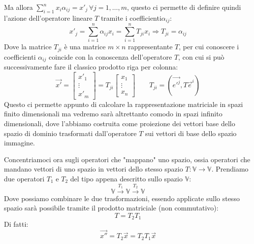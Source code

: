 Ma allora $\sum_{i=1}^{n} x_i\alpha_{ij}={x'}_j \, \forall j=1,\dots,m$, questo ci permette di definire quindi l'azione dell'operatore lineare $T$ tramite i coefficienti$\alpha_{ij}$:
\begin{equation}
    {x'}_j = \sum_{i=1}^{n} \alpha_{ij} x_i =
    \sum_{i=1}^{n} T_{ji} x_i \Longrightarrow T_{ji} = \alpha_{ij}
\end{equation}
Dove la matrice $T_{ji}$ è una matrice $m \times n$ rappresentante $T$, per cui conoscere i coefficienti $\alpha_{ij}$ coincide con la conoscenza dell'operatore $T$, con cui si può successivamente fare il classico prodotto riga per colonna:
\begin{equation*}
    \vec{x'} =
    \begin{bmatrix}
        {x'}_1 \\
        \vdots \\
        {x'}_m
    \end{bmatrix} =
    T_{ji} \begin{bmatrix}
        x_1 \\
        \vdots \\
        x_n
    \end{bmatrix} \qquad
    T_{ji} = (\vec{{e'}^j},T\vec{e}^i)
\end{equation*}
Questo ci permette appunto di calcolare la rappresentazione matriciale in spazi finito dimensionali ma vedremo sarà altrettanto comodo in spazi infinito dimensionali, dove l'abbiamo costruita come proiezione dei vettori base dello spazio di dominio trasformati dall'operatore $T$ sui vettori di base dello spazio immagine.

Concentriamoci ora sugli operatori che "mappano" uno spazio, ossia operatori che mandano vettori di uno spazio in vettori dello stesso spazio $T:\mathbb{V}\longrightarrow\mathbb{V}$. Prendiamo due operatori $T_1$ e $T_2$ del tipo appena descritto sullo spazio $\mathbb{V}$:
\begin{equation*}
    \mathbb{V} \xrightarrow{T_1} \mathbb{V} \xrightarrow{T_2} \mathbb{V}
\end{equation*}
Dove possiamo combinare le due trasformazioni, essendo applicate sullo stesso spazio sarà possibile tramite il prodotto matriciale (non commutativo):
\begin{equation*}
    T=T_2T_1
\end{equation*}
Di fatti:
\begin{equation*}
    \vec{x''} = T_2\vec{x} = T_2T_1\vec{x}
\end{equation*}

